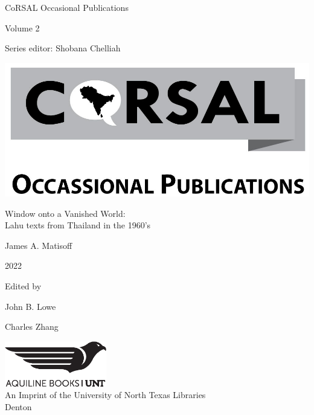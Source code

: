 \thispagestyle{empty}
\begin{center}

\vspace{4cm}
{\Large CoRSAL Occasional Publications}

\vspace{2cm}

{\Large Volume 2}

\vspace{8cm}

Series editor: Shobana Chelliah

\includegraphics[scale=0.15]{CoRSAL-Logo-BW-v03.png}

\end{center}
\clearpage{\thispagestyle{empty}\cleardoublepage}
\begin{center}
\thispagestyle{empty}
\vspace{4cm}
{\huge Window onto a Vanished World:\\\vspace{.75em}Lahu texts from Thailand in the 1960’s}

\vspace{3cm}

{\Large James A. Matisoff}
\vspace{2cm}

2022

\vspace{2cm}

Edited by

John B. Lowe

Charles Zhang

\vspace{4cm}
\includegraphics[width=1.75in]{AquilineBooksUNT.eps}\\
\vspace{1cm}
An Imprint of the University of North Texas Libraries\\
\vspace{1cm}
Denton
\end{center}
